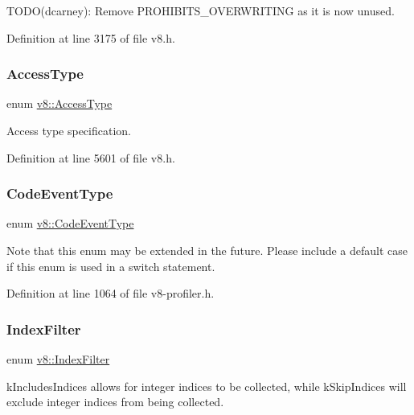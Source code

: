 T\+O\+D\+O(dcarney)\+: Remove P\+R\+O\+H\+I\+B\+I\+T\+S\+\_\+\+O\+V\+E\+R\+W\+R\+I\+T\+I\+NG as it is now unused. 

Definition at line 3175 of file v8.\+h.

\mbox{\label{namespacev8_add8bef6469c5b94706584124e610046c}} 
\subsubsection{\texorpdfstring{Access\+Type}{AccessType}}
{\footnotesize\ttfamily enum \mbox{\hyperlink{namespacev8_add8bef6469c5b94706584124e610046c}{v8\+::\+Access\+Type}}}

Access type specification. 

Definition at line 5601 of file v8.\+h.

\mbox{\label{namespacev8_af0ff31131cc32ced9b5279b321569bbc}} 
\subsubsection{\texorpdfstring{Code\+Event\+Type}{CodeEventType}}
{\footnotesize\ttfamily enum \mbox{\hyperlink{namespacev8_af0ff31131cc32ced9b5279b321569bbc}{v8\+::\+Code\+Event\+Type}}}

Note that this enum may be extended in the future. Please include a default case if this enum is used in a switch statement. 

Definition at line 1064 of file v8-\/profiler.\+h.

\mbox{\label{namespacev8_a46fd71fef702b35b34ed7495e7a63323}} 
\subsubsection{\texorpdfstring{Index\+Filter}{IndexFilter}}
{\footnotesize\ttfamily enum \mbox{\hyperlink{namespacev8_a46fd71fef702b35b34ed7495e7a63323}{v8\+::\+Index\+Filter}}\hspace{0.3cm}{\ttfamily [strong]}}

k\+Includes\+Indices allows for integer indices to be collected, while k\+Skip\+Indices will exclude integer indices from being collected. 

